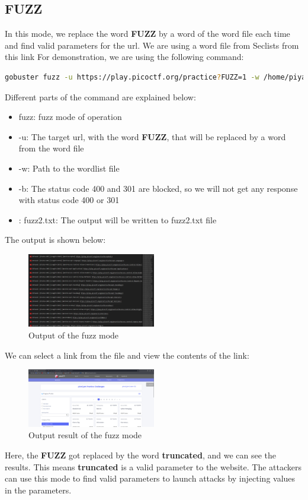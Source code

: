 \documentclass[12 pt]{article}
\begin{document}
\subsection{FUZZ}
In this mode, we replace the word \textbf{FUZZ} by a word of the word file each time and find valid parameters for the url. We are using a word file from Seclists from this link\cite{seclists} For demonstration, we are using the following command:
\begin{lstlisting}[language=bash]
gobuster fuzz -u https://play.picoctf.org/practice?FUZZ=1 -w /home/piyal/SecLists/Discovery/Web-Content/BurpSuite-ParamMiner/lowercase-headers -b 400,301 > fuzz2.txt
\end{lstlisting}
Different parts of the command are explained below:
\begin{itemize}
    \item fuzz: fuzz mode of operation
    \item -u: The target url, with the word \textbf{FUZZ}, that will be replaced by a word from the word file 
    \item -w: Path to the wordlist file
    \item -b: The status code 400 and 301 are blocked, so we will not get any response with status code 400 or 301
    \item: fuzz2.txt: The output will be written to fuzz2.txt file
\end{itemize}
The output is shown below:
\begin{figure}[H]
    \centering
    \includegraphics[width=0.5\textwidth]{Fuzz_Output.png}
    \caption{Output of the fuzz mode}
    \label{fig: FUZZ Output}
\end{figure}
\newline
We can select a link from the file and view the contents of the link:\\
\begin{figure}[H]
    \centering
    \includegraphics[width=0.5\textwidth]{Fuzz_Output_Link.png}
    \caption{Output result of the fuzz mode}
    \label{fig: FUZZ Output Result}
\end{figure}
\newline
Here, the \textbf{FUZZ} got replaced by the word \textbf{truncated}, and we can see the results. This means \textbf{truncated} is a valid parameter to the website. The attackers can use this mode to find valid parameters to launch attacks by injecting values in the parameters.
\end{document}
